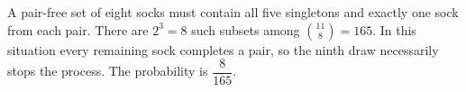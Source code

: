 A pair-free set of eight socks must contain all five singletons and exactly one sock from each pair. There are $2^3=8$ such subsets among $\binom{11}{8}=165$. In this situation every remaining sock completes a pair, so the ninth draw necessarily stops the process. The probability is $\boxed{\dfrac{8}{165}}$.
